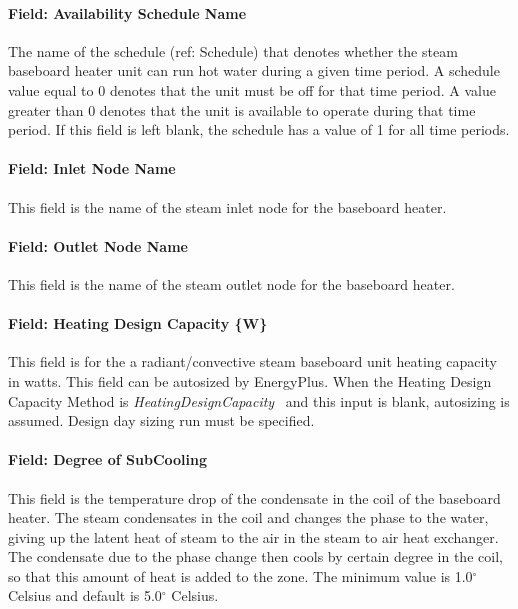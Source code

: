 \paragraph{Field: Availability Schedule Name}\label{field-availability-schedule-name-1-010}

The name of the schedule (ref: Schedule) that denotes whether the steam baseboard heater unit can run hot water during a given time period. A schedule value equal to 0 denotes that the unit must be off for that time period. A value greater than 0 denotes that the unit is available to operate during that time period. If this field is left blank, the schedule has a value of 1 for all time periods.

\paragraph{Field: Inlet Node Name}\label{field-inlet-node-name-1-003}

This field is the name of the steam inlet node for the baseboard heater.

\paragraph{Field: Outlet Node Name}\label{field-outlet-node-name-1-004}

This field is the name of the steam outlet node for the baseboard heater.

\paragraph{Field: Heating Design Capacity \{W\}}\label{field-heating-design-capacity-w-1-000}

This field is for the a radiant/convective steam baseboard unit heating capacity in watts. This field can be autosized by EnergyPlus. When the Heating Design Capacity Method is \emph{HeatingDesignCapacity}~ and this input is blank, autosizing is assumed. Design day sizing run must be specified.

\paragraph{Field: Degree of SubCooling}\label{field-degree-of-subcooling-000}

This field is the temperature drop of the condensate in the coil of the baseboard heater. The steam condensates in the coil and changes the phase to the water, giving up the latent heat of steam to the air in the steam to air heat exchanger. The condensate due to the phase change then cools by certain degree in the coil, so that this amount of heat is added to the zone. The minimum value is 1.0$^\circ$ Celsius and default is 5.0$^\circ$ Celsius.

